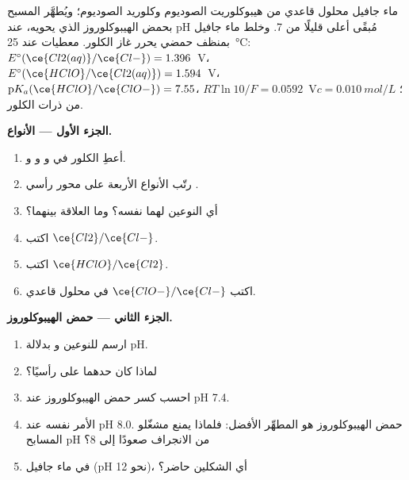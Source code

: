 \begin{problem}
\label{pb:b1:e-ph-diagrams:1}
ماء جافيل محلول قاعدي من هيبوكلوريت الصوديوم وكلوريد الصوديوم؛
ويُطهَّر المسبح بحمض الهيبوكلوروز الذي يحويه، عند
pH مُبقًى أعلى قليلًا من 7. وخلط ماء جافيل بمنظف حمضي يحرر
غاز الكلور. معطيات عند \qty{25}{\celsius}: $E^\circ(\ce{Cl2(aq)}/\ce{Cl-})
= 1.396$~V، $E^\circ(\ce{HClO}/\ce{Cl2(aq)}) = 1.594$~V،
$\mathrm{p}K_a(\ce{HClO}/\ce{ClO-}) = 7.55$، $RT\ln 10/F = 0.0592$~V؛
 $c = \qty{0.010}{mol/L}$ من ذرات الكلور.

\medskip
\noindent\textbf{الجزء الأول --- الأنواع.}
\begin{enumerate}
  \item أعطِ  الكلور في  و
        و و.
  \item رتّب الأنواع الأربعة على محور رأسي .
  \item أي النوعين لهما  نفسه؟ وما العلاقة
        بينهما؟
  \item اكتب  $\ce{Cl2}/\ce{Cl-}$.
  \item اكتب  $\ce{HClO}/\ce{Cl2}$.
  \item اكتب  $\ce{ClO-}/\ce{Cl-}$ في محلول قاعدي.
\end{enumerate}

\medskip
\noindent\textbf{الجزء الثاني --- حمض الهيبوكلوروز.}
\begin{enumerate}[resume]
  \item ارسم  للنوعين  و بدلالة
        pH.
  \item لماذا كان حدهما على  رأسيًا؟
  \item احسب كسر حمض الهيبوكلوروز عند pH 7.4.
  \item الأمر نفسه عند pH 8.0. حمض الهيبوكلوروز هو المطهِّر الأفضل: فلماذا
        يمنع مشغّلو المسابح pH من الانجراف صعودًا إلى 8؟
  \item في ماء جافيل (pH نحو 12)، أي الشكلين حاضر؟
\end{enumerate}


\end{problem}

